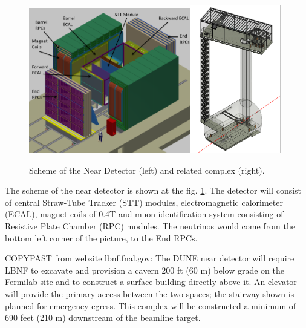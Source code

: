 \begin{figure}
\caption{Scheme of the Near Detector (left) and related complex (right).}
\label{fig:nearDetector}
\centering
\includegraphics[width=0.63\textwidth, keepaspectratio=true]{figs/nearDetector.png}\includegraphics[width=0.35\textwidth, keepaspectratio=true]{figs/nearDetector_project.png}
\end{figure}

The scheme of the near detector is shown at the fig. \ref{fig:nearDetector}. The detector will consist of central Straw-Tube Tracker (STT) modules, electromagnetic calorimeter (ECAL), magnet coils of 0.4T and muon identification system consisting of Resistive Plate Chamber (RPC) modules. The neutrinos would come from the bottom left corner of the picture, to the End RPCs.

COPYPAST from website lbnf.fnal.gov: The DUNE near detector will require LBNF to excavate and provision a cavern 200 ft (60 m) below grade on the Fermilab site and to construct a surface building directly above it. An elevator will provide the primary access between the two spaces; the stairway shown is planned for emergency egress. This complex will be constructed a minimum of 690 feet (210 m) downstream of the beamline target.

